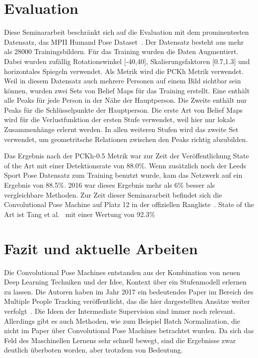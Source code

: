 \documentclass[journal, a4paper]{IEEEtran}
\begin{document}
\section{Evaluation}

        Diese Seminararbeit beschränkt sich auf die Evaluation mit dem prominentesten Datensatz, das MPII Humand Pose Dataset~\cite{MPII}. Der Datensatz besteht aus mehr als 28000 Trainingsbildern. Für das Training wurden die Daten Augmentiert. Dabei wurden zufällig Rotationswinkel [-40\degree,40\degree], Skalierungsfaktoren [0.7,1.3] und horizontales Spiegeln verwendet. Als Metrik wird die PCKh Metrik verwendet. %
        Weil in diesem Datensatz auch mehrere Personen auf einem Bild sichtbar sein können, wurden zwei Sets von Belief Maps für das Training erstellt. Eine enthält alle Peaks für jede Person in der Nähe der Hauptperson. Die Zweite enthält nur Peaks für die Schlüsselpunkte der Hauptperson.
        Die erste Art von Belief Maps wird für die Verlustfunktion der ersten Stufe verwendet, weil hier nur lokale Zusammenhänge erlernt werden. In allen weiteren Stufen wird das zweite Set verwendet, um geometritsche Relationen zwischen den Peaks richtig abzubilden.

        Das Ergebnis nach der PCKh-0.5 Metrik war zur Zeit der Veröffentlichung State of the Art mit einer Detektionsrate von 88.0\%. Wenn zusätzlich noch der Leeds Sport Pose Datensatz zum Training benutzt wurde, kam das Netzwerk auf ein Ergebnis von 88.5\%. 2016 war dieses Ergebnis mehr als 6\% besser als vergleichbare Methoden. Zur Zeit dieser Seminararbeit befindet sich die Convolutional Pose Machine auf Platz 12 in der offiziellen Rangliste~\cite{MPII}. State of the Art ist Tang et al.~\cite{tang2018deeply} mit einer Wertung von 92.3\%
        
\section{Fazit und aktuelle Arbeiten}
        Die Convolutional Pose Machines entstanden aus der Kombination von neuen Deep Learning Techniken und der Idee, Kontext über ein Stufenmodell erlernen zu lassen. Die Autoren haben im Jahr 2017 ein bedeutendes Paper im Bereich des Multiple People Tracking veröffentlicht, das die hier dargestellten Ansätze weiter verfolgt~\cite{cao2017realtime,wei2016cpm}. Die Ideen der Intermediate Supervision sind immer noch relevant. Allerdings gibt es auch Methoden, wie zum Beispiel Batch Normalization, die nicht im Paper über Convolutional Pose Machines betrachtet wurden. Da sich das Feld des Maschinellen Lernens sehr schnell bewegt, sind die Ergebnisse zwar deutlich überboten worden, aber trotzdem von Bedeutung.




\end{document}
